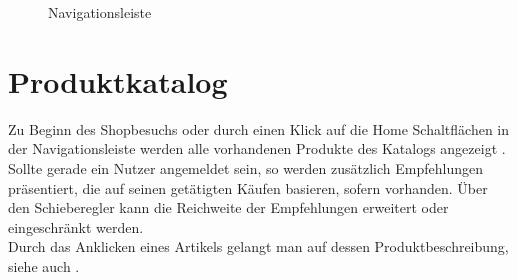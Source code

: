 \begin{figure}[h!]
  \centering
  \caption{Navigationsleiste}
  \label{fig:Navigationsleiste}
\end{figure}


\section{Produktkatalog}
Zu Beginn des Shopbesuchs oder durch einen Klick auf die Home Schaltflächen in der Navigationsleiste werden alle vorhandenen Produkte des Katalogs angezeigt . Sollte gerade ein Nutzer angemeldet sein, so werden zusätzlich Empfehlungen prä\-sen\-tiert, die auf seinen getätigten Käufen basieren, sofern vorhanden. Über den Schieberegler  kann die Reichweite der Empfehlungen erweitert oder eingeschränkt werden. \\
Durch das Anklicken eines Artikels gelangt man auf dessen Produktbeschreibung, siehe auch .

